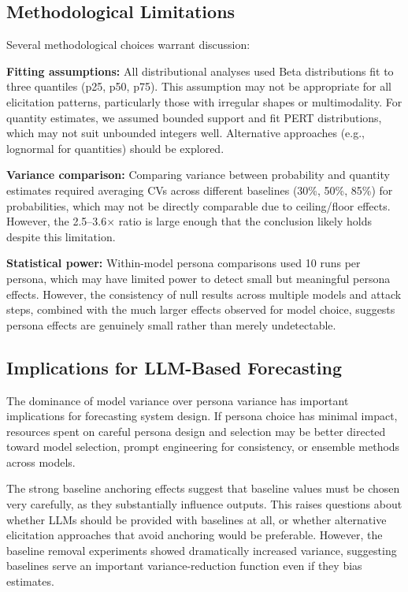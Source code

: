 \documentclass[midterm]{sparreport}
\begin{document}
\subsection{Methodological Limitations}

Several methodological choices warrant discussion:

\textbf{Fitting assumptions:} All distributional analyses used Beta distributions fit to three quantiles (p25, p50, p75). This assumption may not be appropriate for all elicitation patterns, particularly those with irregular shapes or multimodality. For quantity estimates, we assumed bounded support and fit PERT distributions, which may not suit unbounded integers well. Alternative approaches (e.g., lognormal for quantities) should be explored.

\textbf{Variance comparison:} Comparing variance between probability and quantity estimates required averaging CVs across different baselines (30\%, 50\%, 85\%) for probabilities, which may not be directly comparable due to ceiling/floor effects. However, the 2.5--3.6$\times$ ratio is large enough that the conclusion likely holds despite this limitation.

\textbf{Statistical power:} Within-model persona comparisons used 10 runs per persona, which may have limited power to detect small but meaningful persona effects. However, the consistency of null results across multiple models and attack steps, combined with the much larger effects observed for model choice, suggests persona effects are genuinely small rather than merely undetectable.

\subsection{Implications for LLM-Based Forecasting}

The dominance of model variance over persona variance has important implications for forecasting system design. If persona choice has minimal impact, resources spent on careful persona design and selection may be better directed toward model selection, prompt engineering for consistency, or ensemble methods across models.

The strong baseline anchoring effects suggest that baseline values must be chosen very carefully, as they substantially influence outputs. This raises questions about whether LLMs should be provided with baselines at all, or whether alternative elicitation approaches that avoid anchoring would be preferable. However, the baseline removal experiments showed dramatically increased variance, suggesting baselines serve an important variance-reduction function even if they bias estimates.
\end{document}
